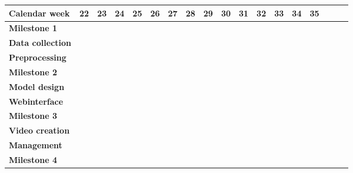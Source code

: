 \documentclass[s=english,inputenc=utf8,fontsize=10pt]{ldvarticle}
\begin{document}
\begin{center}
\begin{footnotesize}
\setlength{\arrayrulewidth}{1,05pt}
\begin{tabular}[htb]{|m{}|p{.3cm}|p{.3cm}|p{.3cm}|p{.3cm}|p{.3cm}|p{.3cm}|p{.3cm}|p{.3cm}|p{.3cm}|p{.3cm}|p{.3cm}|p{.3cm}|p{.3cm}|p{.3cm}|p{.3cm}|p{.3cm}|p{.3cm}|}
	\hline
	\textbf{Calendar week}&\tiny\textbf{22}&\tiny\textbf{23}&\tiny\textbf{24}&\tiny\textbf{25}& \tiny \textbf{26} & \tiny \textbf{27} & \tiny \textbf{28} & \tiny \textbf{29} &  \tiny \textbf{30} &  \tiny \textbf{31} &  \tiny \textbf{32} &  \tiny \textbf{33}  &  \tiny \textbf{34} &  \tiny \textbf{35} \\
	\hline
	\hline
	\rowcolor{lightgray} \textbf{Milestone 1}& \cellcolor{red} & & & & & & & & & & & & &\\
	\hline
	\rowcolor{lightgray} \textbf{Data collection}& \cellcolor{black} & \cellcolor{black} & \cellcolor{black} & \cellcolor{black} & & & & & & & & & & \\
	\hline
	\rowcolor{lightgray} \textbf{Preprocessing}& & & & \cellcolor{black} & \cellcolor{black} & \cellcolor{black} & \cellcolor{black} & & & & & & &\\
	\hline
	\rowcolor{lightgray} \textbf{Milestone 2}& & & & & \cellcolor{red} & & & & & & & & &\\
	\hline
	\rowcolor{lightgray} \textbf{Model design}& & & & & & & \cellcolor{black} & \cellcolor{black} & \cellcolor{black} & \cellcolor{black} & & & & \\
	\hline
	\rowcolor{lightgray} \textbf{Webinterface}& & & & & \cellcolor{black} & \cellcolor{black} & & & & & \cellcolor{black} & & &\\
	\hline
	\rowcolor{lightgray} \textbf{Milestone 3}& & & & & & & & & \cellcolor{red} & & & & &\\
	\hline
	\rowcolor{lightgray} \textbf{Video creation}& & & & & & & & & & & & \cellcolor{black} & \cellcolor{black} & \\
	\hline
	\rowcolor{lightgray} \textbf{Management}& \cellcolor{black} & \cellcolor{black} & \cellcolor{black} & \cellcolor{black} & \cellcolor{black} & \cellcolor{black} & \cellcolor{black} & \cellcolor{black} & \cellcolor{black} & \cellcolor{black} & \cellcolor{black} & \cellcolor{black} & \cellcolor{black} & \cellcolor{black} \\
	\hline
	\rowcolor{lightgray} \textbf{Milestone 4}& & & & & & & & & & & & & & \cellcolor{red}\\
	\hline

\end{tabular}
\end{footnotesize}
\end{center}
\end{document}
